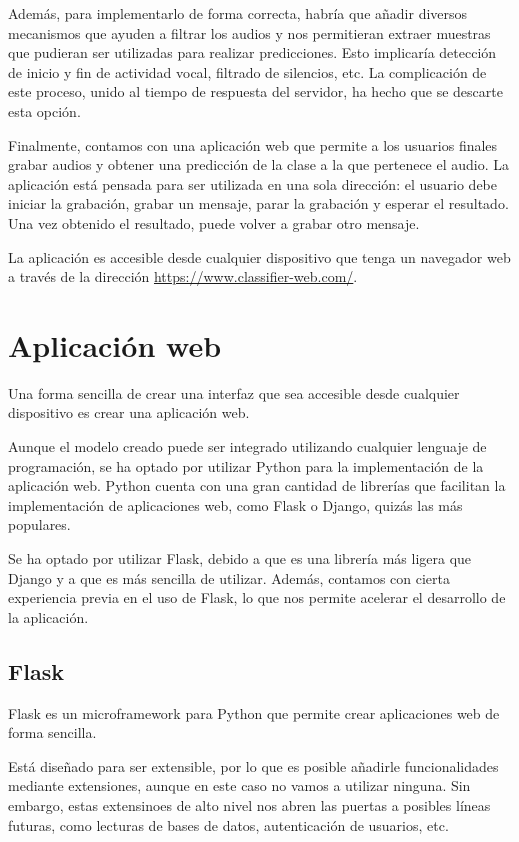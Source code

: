Además, para implementarlo de forma correcta, habría que añadir diversos mecanismos que ayuden a filtrar los audios y nos permitieran extraer muestras que pudieran ser utilizadas para realizar predicciones.
Esto implicaría detección de inicio y fin de actividad vocal, filtrado de silencios, etc.
La complicación de este proceso, unido al tiempo de respuesta del servidor, ha hecho que se descarte esta opción.

Finalmente, contamos con una aplicación web que permite a los usuarios finales grabar audios y obtener una predicción de la clase a la que pertenece el audio.
La aplicación está pensada para ser utilizada en una sola dirección: el usuario debe iniciar la grabación, grabar un mensaje, parar la grabación y esperar el resultado.
Una vez obtenido el resultado, puede volver a grabar otro mensaje.

La aplicación es accesible desde cualquier dispositivo que tenga un navegador web a través de la dirección \url{https://www.classifier-web.com/}.


\section{Aplicación web}
Una forma sencilla de crear una interfaz que sea accesible desde cualquier dispositivo es crear una aplicación web.

Aunque el modelo creado puede ser integrado utilizando cualquier lenguaje de programación, se ha optado por utilizar Python para la implementación de la aplicación web.
Python cuenta con una gran cantidad de librerías que facilitan la implementación de aplicaciones web, como Flask o Django, quizás las más populares.

Se ha optado por utilizar Flask, debido a que es una librería más ligera que Django y a que es más sencilla de utilizar.
Además, contamos con cierta experiencia previa en el uso de Flask, lo que nos permite acelerar el desarrollo de la aplicación.


\subsection{Flask}
Flask es un microframework para Python que permite crear aplicaciones web de forma sencilla.

Está diseñado para ser extensible, por lo que es posible añadirle funcionalidades mediante extensiones, aunque en este caso no vamos a utilizar ninguna.
Sin embargo, estas extensinoes de alto nivel nos abren las puertas a posibles líneas futuras, como lecturas de bases de datos, autenticación de usuarios, etc.

